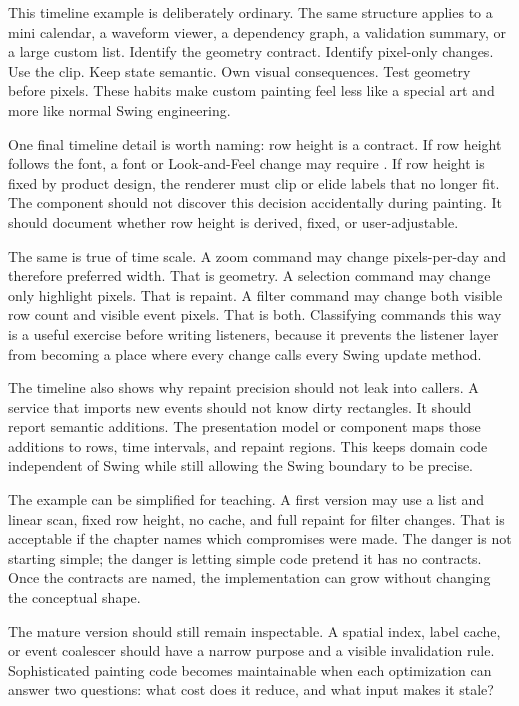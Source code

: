 This timeline example is deliberately ordinary. The same structure applies to a mini calendar, a waveform viewer, a dependency graph, a validation summary, or a large custom list. Identify the geometry contract. Identify pixel-only changes. Use the clip. Keep state semantic. Own visual consequences. Test geometry before pixels. These habits make custom painting feel less like a special art and more like normal Swing engineering.

One final timeline detail is worth naming: row height is a contract. If row height follows the font, a font or Look-and-Feel change may require . If row height is fixed by product design, the renderer must clip or elide labels that no longer fit. The component should not discover this decision accidentally during painting. It should document whether row height is derived, fixed, or user-adjustable.

The same is true of time scale. A zoom command may change pixels-per-day and therefore preferred width. That is geometry. A selection command may change only highlight pixels. That is repaint. A filter command may change both visible row count and visible event pixels. That is both. Classifying commands this way is a useful exercise before writing listeners, because it prevents the listener layer from becoming a place where every change calls every Swing update method.

The timeline also shows why repaint precision should not leak into callers. A service that imports new events should not know dirty rectangles. It should report semantic additions. The presentation model or component maps those additions to rows, time intervals, and repaint regions. This keeps domain code independent of Swing while still allowing the Swing boundary to be precise.

The example can be simplified for teaching. A first version may use a list and linear scan, fixed row height, no cache, and full repaint for filter changes. That is acceptable if the chapter names which compromises were made. The danger is not starting simple; the danger is letting simple code pretend it has no contracts. Once the contracts are named, the implementation can grow without changing the conceptual shape.

The mature version should still remain inspectable. A spatial index, label cache, or event coalescer should have a narrow purpose and a visible invalidation rule. Sophisticated painting code becomes maintainable when each optimization can answer two questions: what cost does it reduce, and what input makes it stale?

